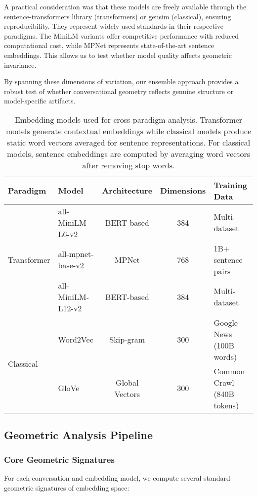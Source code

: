\documentclass[11pt,letterpaper]{article}
\begin{document}
A practical consideration was that these models are freely available through the sentence-transformers library (transformers) or gensim (classical), ensuring reproducibility. They represent widely-used standards in their respective paradigms. The MiniLM variants offer competitive performance with reduced computational cost, while MPNet represents state-of-the-art sentence embeddings. This allows us to test whether model quality affects geometric invariance.

By spanning these dimensions of variation, our ensemble approach provides a robust test of whether conversational geometry reflects genuine structure or model-specific artifacts.

\begin{table}[h]
\centering
\begin{tabular}{llccl}
\toprule
Paradigm & Model & Architecture & Dimensions & Training Data \\
\midrule
\multirow{3}{*}{Transformer} & all-MiniLM-L6-v2 & BERT-based & 384 & Multi-dataset\\
& all-mpnet-base-v2 & MPNet & 768 & 1B+ sentence pairs\\
& all-MiniLM-L12-v2 & BERT-based & 384 & Multi-dataset\\
\midrule
\multirow{2}{*}{Classical} & Word2Vec & Skip-gram & 300 & Google News (100B words)\\
& GloVe & Global Vectors & 300 & Common Crawl (840B tokens)\\
\bottomrule
\end{tabular}
\caption{Embedding models used for cross-paradigm analysis. Transformer models generate contextual embeddings while classical models produce static word vectors averaged for sentence representations. For classical models, sentence embeddings are computed by averaging word vectors after removing stop words.}
\label{tab:embedding_models}
\end{table}

\subsection{Geometric Analysis Pipeline}

\subsubsection{Core Geometric Signatures}

For each conversation and embedding model, we compute several standard geometric signatures of embedding space:
\end{document}

